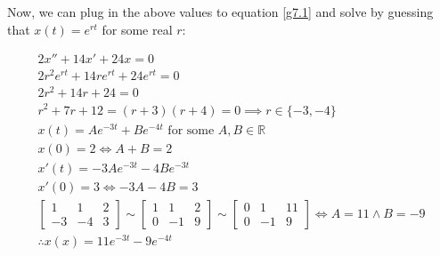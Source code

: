 \documentclass{article}
\newcommand{\reals}{\mathbb{R}}
\begin{document}
Now, we can plug in the above values to equation \ref{g7.1} and solve
by guessing that $x(t) = e^{rt}$ for some real $r$:

\begin{align}
	2x'' + 14x' + 24x = 0 \\
	2r^2e^{rt} + 14re^{rt} + 24e^{rt} = 0 \\
	2r^2+ 14r+ 24 = 0 \\
	r^2+ 7r+ 12 = (r+3)(r+4) = 0 \implies r \in \{ -3, -4 \} \\
	x(t) = Ae^{-3t}+Be^{-4t} \textrm{ for some } A,B \in \reals \\
	x(0) = 2 \iff A+B = 2 \\
	x'(t) = -3Ae^{-3t}-4Be^{-3t} \\
	x'(0) = 3 \iff -3A-4B = 3 \\
	\begin{bmatrix} 1 & 1 & 2 \\ -3 & -4 & 3 \end{bmatrix} \sim
	\begin{bmatrix} 1 & 1 & 2 \\ 0 & -1 & 9 \end{bmatrix} \sim
	\begin{bmatrix} 0 & 1 & 11 \\ 0 & -1 & 9 \end{bmatrix} \iff
	A = 11 \land B = -9 \\
	\therefore x(x) = 11e^{-3t}-9e^{-4t}
\end{align}
\end{document}
